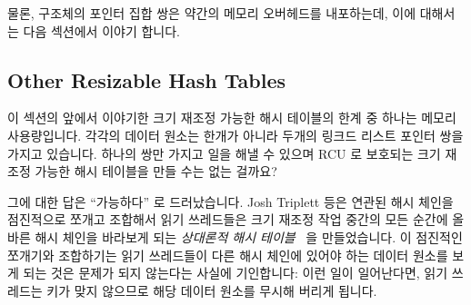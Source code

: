 물론,  구조체의 포인터 집합 쌍은 약간의 메모리 오버헤드를
내포하는데, 이에 대해서는 다음 섹션에서 이야기 합니다.

\subsection{Other Resizable Hash Tables}
\label{sec:datastruct:Other Resizable Hash Tables}

이 섹션의 앞에서 이야기한 크기 재조정 가능한 해시 테이블의 한계 중 하나는
메모리 사용량입니다.
각각의 데이터 원소는 한개가 아니라 두개의 링크드 리스트 포인터 쌍을 가지고
있습니다.
하나의 쌍만 가지고 일을 해낼 수 있으며 RCU 로 보호되는 크기 재조정 가능한 해시
테이블을 만들 수는 없는 걸까요?

그에 대한 답은 ``가능하다'' 로 드러났습니다.
Josh Triplett 등은 연관된 해시 체인을 점진적으로 쪼개고 조합해서 읽기
쓰레드들은 크기 재조정 작업 중간의 모든 순간에 올바른 해시 체인을 바라보게 되는
\emph{상대론적 해시 테이블}~\cite{Triplett:2011:RPHash} 을 만들었습니다.
이 점진적인 쪼개기와 조합하기는 읽기 쓰레드들이 다른 해시 체인에 있어야 하는
데이터 원소를 보게 되는 것은 문제가 되지 않는다는 사실에 기인합니다: 이런 일이
일어난다면, 읽기 쓰레드는 키가 맞지 않으므로 해당 데이터 원소를 무시해 버리게
됩니다.

